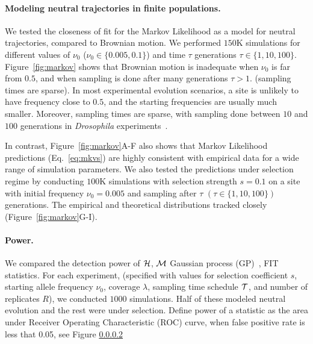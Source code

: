 \documentclass[11pt]{article}
\begin{document}
\paragraph{Modeling neutral trajectories in finite populations.} 
We tested the closeness of fit for the Markov Likelihood as a model
for neutral trajectories, compared to Brownian motion. We performed
$150$K simulations for different values of $\nu_0$
($\nu_0\in\{0.005,0.1\}$) and time $\tau$ generations $\tau\in
\{1,10,100\}$. 
Figure~\ref{fig:markov} shows that Brownian motion is inadequate when
$\nu_0$ is far from $0.5$, and when sampling is done after many
generations $\tau>1$. (sampling times are sparse). In most
experimental evolution scenarios, a site is unlikely to have frequency
close to $0.5$, and the starting frequencies are usually much
smaller. Moreover, sampling times are sparse, with sampling done
between $10$ and $100$ generations in \emph{Drosophila}
experiments~\cite{orozco2012adaptation, zhou2011experimental}.

In contrast, Figure~\ref{fig:markov}A-F also shows that Markov
Likelihood predictions (Eq.~\ref{eq:mkvs}) are highly consistent with
empirical data for a wide range of simulation parameters. We also
tested the predictions under selection regime by conducting $100$K
simulations with selection strength $s=0.1$ on a site with initial
frequency $\nu_0=0.005$ and sampling after $\tau$
$(\tau\in\{1,10,100\})$ generations. The empirical and theoretical
distributions tracked closely (Figure~\ref{fig:markov}G-I).

\paragraph{Power.} We compared the detection power of ${\cal H}$, ${\cal M}$
Gaussian process (GP)~\cite{Terhorst2015Multi},
FIT~\cite{feder2014Identifying} statistics.  For each experiment,
(specified with values for selection coefficient $s$, starting allele
frequency $\nu_0$, coverage $\lambda$, sampling time schedule ${\cal
  T}$, and number of replicates $R$), we conducted $1000$
simulations. Half of these modeled neutral evolution and the rest were
under selection. Define power of a statistic as the area under
Receiver Operating Characteristic (ROC) curve, when false positive
rate is less that 0.05,  see Figure
\ref{}
\end{document}
